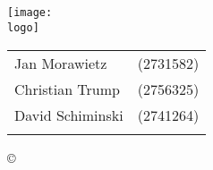 \thispagestyle{plain}
\begin{titlepage}

 \begin{center}

  \huge{\textbf{\titel}}\\ \vspace{1.5ex}
  \LARGE{\textbf{\art}}\\\vspace{1.5ex}

  \texttt{[image: \\logo]} \vspace{4ex}

  \normalsize
  \begin{tabular}{w{5.4cm}p{6cm}} \\ \vspace{1.2ex}
           Jan Morawietz    & (2731582) \\ \vspace{1.2ex}
           Christian Trump  & (2756325) \\ \vspace{1.2ex}
           David Schiminski & (2741264) \\ \vspace{1.2ex}

  \end{tabular}

  \copyright\ \jahr \vspace{5ex}

 \end{center}


\end{titlepage}
